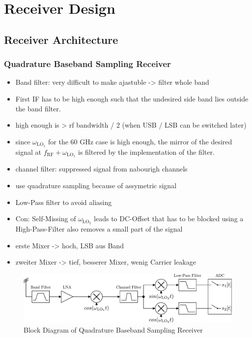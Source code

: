 \chapter{Receiver Design}
\label{chap:rx}
\section{Receiver Architecture}
\subsection{Quadrature Baseband Sampling Receiver}

\begin{itemize}
\item Band filter: very difficult to make ajastuble -> filter whole band
\item First IF has to be high enough such that the undesired side band lies
  outside the band filter.
\item high enough is > rf bandwidth / 2 (when USB / LSB  can be switched later)
\item since $\omega_{\text{LO}_1}$ for the 60 GHz case is high enough, the mirror
  of the desired signal at $f_{\text{RF}} + \omega_{\text{LO}_1}$ is filtered
  by the implementation of the filter.
\item channel filter: suppressed signal from nabourigh channels
\item use quadrature sampling because of assymetric signal
\item Low-Pass filter to avoid aliasing
\item Con: Self-Missing of $\omega_{\text{LO}_2}$ leads to DC-Offset that has to be blocked using a
  High-Pass-Filter also removes a small part of the signal
\item erste Mixer -> hoch, LSB aus Band
\item zweiter Mixer -> tief, besserer Mixer, wenig Carrier leakage
\end{itemize}

\begin{figure}[ht]
  \centering
  \includegraphics[width=\textwidth]{figures/quad_base_rx_block_diagram}
  \caption{Block Diagram of Quadrature Baseband Sampling Receiver}
  \label{fig:rx_quad_base_bd}
\end{figure}

